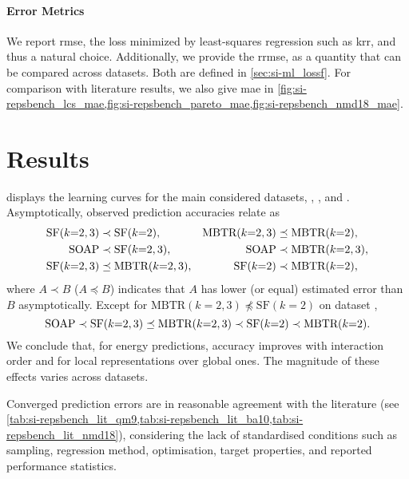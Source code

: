 \paragraph{Error Metrics}
We report \gls{rmse}, the loss minimized by least-squares regression such as \gls{krr}, and thus a natural choice. Additionally, we provide the \gls{rrmse}, as a quantity that can be compared across datasets. Both are defined in \cref{sec:si-ml_lossf}.
For comparison with literature results, we also give \gls{mae} in \cref{fig:si-repsbench_lcs_mae,fig:si-repsbench_pareto_mae,fig:si-repsbench_nmd18_mae}.

\clearpage
\section{Results}

 displays the learning curves for the main considered datasets, \dsgdb, \dsba, and \dstcor.
Asymptotically, observed prediction accuracies relate as
%
\begin{align}
	\text{SF}(k{=}2,3) & \prec   \text{SF}(k{=}2) ,     & \text{MBTR}(k{=}2,3) & \preceq \text{MBTR}(k{=}2) , \notag \\
	\text{SOAP}   & \prec   \text{SF}(k{=}2,3) , & \text{SOAP}     & \prec   \text{MBTR}(k{=}2,3) , \notag\\
	\text{SF}(k{=}2,3) & \preceq \text{MBTR}(k{=}2,3) , & \text{SF}(k{=}2)     & \prec   \text{MBTR}(k{=}2) , \notag
\end{align}
%
where $A \prec B$ ($A \preceq B$) indicates that $A$ has lower (or equal) estimated error than~$B$ asymptotically.
Except for $\text{MBTR}(k{=}2,3) \not\preceq \text{SF}(k{=}2)$ on dataset \dstcor{},
%
\begin{equation}
	\text{SOAP} \prec \text{SF}(k{=}2,3) \preceq \text{MBTR}(k{=}2,3) \prec \text{SF}(k{=}2) \prec \text{MBTR}(k{=}2) .\notag
\end{equation}
% 
We conclude that, for energy predictions, accuracy improves with interaction order and for local representations over global ones.
The magnitude of these effects varies across datasets.

Converged prediction errors are in reasonable agreement with the literature (see \cref{tab:si-repsbench_lit_qm9,tab:si-repsbench_lit_ba10,tab:si-repsbench_lit_nmd18}), considering the lack of standardised conditions such as sampling, regression method, \hp optimisation, target properties, and reported performance statistics.



